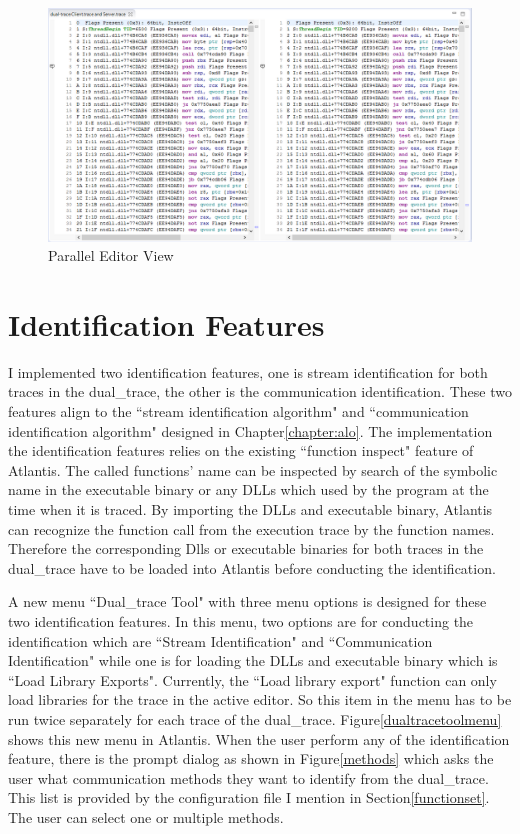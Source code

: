 \begin{figure}[H]
\centerline{\includegraphics[scale=0.5]{Figures/paralleleditor}}
 \caption{Parallel Editor View}
\label{paralleleditor}
\end{figure}



\section{Identification Features}
I implemented two identification features, one is stream identification for both traces in the dual\_trace, the other is the communication identification. These two features align to the ``stream identification algorithm" and ``communication identification algorithm" designed in Chapter\ref{chapter:alo}. The implementation the identification features relies on the existing ``function inspect" feature of Atlantis. The called functions' name can be inspected  by  search of the symbolic name in the executable binary or any DLLs which used by the program at the time when it is traced. By importing the DLLs and executable binary, Atlantis can recognize the function call from the execution trace by the function names. Therefore the corresponding Dlls or executable binaries for both traces in the dual\_trace have to be loaded into Atlantis before conducting the identification.

A new menu ``Dual\_trace Tool" with three menu options is  designed for these two identification features. In this menu, two options are for conducting the identification which are ``Stream Identification" and ``Communication Identification" while one is for loading the DLLs and executable binary which is ``Load Library Exports". Currently, the ``Load library export" function can only load libraries for the trace in the active editor. So this item in the menu has to be run twice separately for each trace of the dual\_trace.  Figure\ref{dualtracetoolmenu} shows this new menu in Atlantis. When the user perform any of the identification feature, there is the prompt dialog as shown in Figure\ref{methods} which asks the user what communication methods they want to identify from the dual\_trace. This list is provided by the configuration file I mention in Section\ref{functionset}. The user can select one or multiple methods. 

